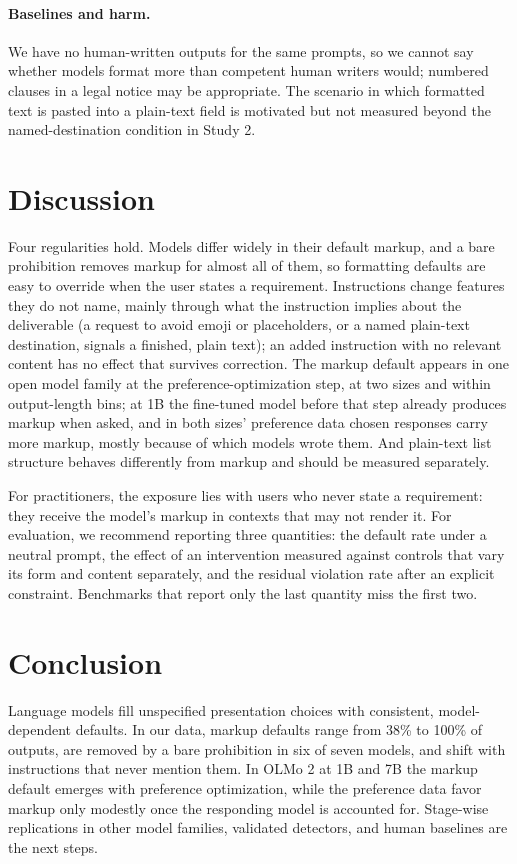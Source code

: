\documentclass[acmsmall,screen,review,anonymous]{acmart}
\begin{document}
\paragraph{Baselines and harm.} We have no human-written outputs for the same prompts, so we cannot say whether models format more than competent human writers would; numbered clauses in a legal notice may be appropriate. The scenario in which formatted text is pasted into a plain-text field is motivated but not measured beyond the named-destination condition in Study 2.

\section{Discussion}

Four regularities hold. Models differ widely in their default markup, and a bare prohibition removes markup for almost all of them, so formatting defaults are easy to override when the user states a requirement. Instructions change features they do not name, mainly through what the instruction implies about the deliverable (a request to avoid emoji or placeholders, or a named plain-text destination, signals a finished, plain text); an added instruction with no relevant content has no effect that survives correction. The markup default appears in one open model family at the preference-optimization step, at two sizes and within output-length bins; at 1B the fine-tuned model before that step already produces markup when asked, and in both sizes' preference data chosen responses carry more markup, mostly because of which models wrote them. And plain-text list structure behaves differently from markup and should be measured separately.

For practitioners, the exposure lies with users who never state a requirement: they receive the model's markup in contexts that may not render it. For evaluation, we recommend reporting three quantities: the default rate under a neutral prompt, the effect of an intervention measured against controls that vary its form and content separately, and the residual violation rate after an explicit constraint. Benchmarks that report only the last quantity miss the first two.

\section{Conclusion}

Language models fill unspecified presentation choices with consistent, model-dependent defaults. In our data, markup defaults range from 38\% to 100\% of outputs, are removed by a bare prohibition in six of seven models, and shift with instructions that never mention them. In OLMo 2 at 1B and 7B the markup default emerges with preference optimization, while the preference data favor markup only modestly once the responding model is accounted for. Stage-wise replications in other model families, validated detectors, and human baselines are the next steps.
\end{document}
